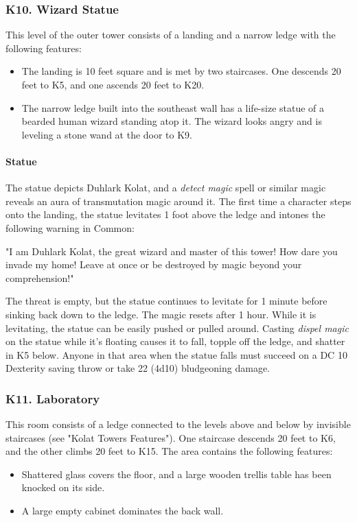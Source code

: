 \documentclass[10pt,a4paper,twoside,twocolumn,openany,nodeprecatedcode]{dndbook}
\begin{document}
\subsubsection{K10. Wizard Statue}
This level of the outer tower consists of a landing and a narrow ledge with the following features:
\begin{itemize}

\item The landing is 10 feet square and is met by two staircases. One descends 20 feet to K5, and one ascends 20 feet to K20.
\item The narrow ledge built into the southeast wall has a life-size statue of a bearded human wizard standing atop it. The wizard looks angry and is leveling a stone wand at the door to K9.
\end{itemize}


\paragraph{Statue}
The statue depicts Duhlark Kolat, and a \textit{detect magic} spell or similar magic reveals an aura of transmutation magic around it. The first time a character steps onto the landing, the statue levitates 1 foot above the ledge and intones the following warning in Common:
\begin{DndReadAloud}{}
"I am Duhlark Kolat, the great wizard and master of this tower! How dare you invade my home! Leave at once or be destroyed by magic beyond your comprehension!"
\end{DndReadAloud}

The threat is empty, but the statue continues to levitate for 1 minute before sinking back down to the ledge. The magic resets after 1 hour. While it is levitating, the statue can be easily pushed or pulled around.
Casting \textit{dispel magic} on the statue while it's floating causes it to fall, topple off the ledge, and shatter in K5 below. Anyone in that area when the statue falls must succeed on a DC 10 Dexterity saving throw or take 22 (4d10) bludgeoning damage.
\subsubsection{K11. Laboratory}
This room consists of a ledge connected to the levels above and below by invisible staircases (see "Kolat Towers Features"). One staircase descends 20 feet to K6, and the other climbs 20 feet to K15. The area contains the following features:
\begin{itemize}

\item Shattered glass covers the floor, and a large wooden trellis table has been knocked on its side.
\item A large empty cabinet dominates the back wall.
\end{itemize}
\end{document}
